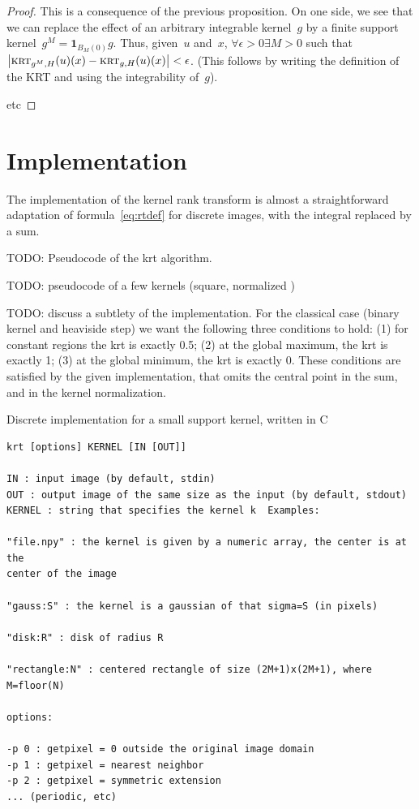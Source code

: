 \documentclass[12pt]{article}                  %
\begin{document}
\begin{proof}
	This is a consequence of the previous proposition.  On one side, we
	see that we can replace the effect of an arbitrary integrable
	kernel~$g$ by a finite support kernel~$g^M=\mathbf{1}_{B_M(0)}g$.
	Thus, given~$u$ and~$x$, $\forall\epsilon>0\exists M>0$ such
	that~$\left|\textsc{krt}_{g^M,H}(u)(x)-\textsc{krt}_{g,H}(u)(x)\right|<\epsilon$.  (This follows
	by writing the definition of the KRT and using the integrability
	of~$g$).

	etc
\end{proof}


\section{Implementation}

The implementation of the kernel rank transform is almost a straightforward
adaptation of formula~\ref{eq:rtdef} for discrete images, with the integral
replaced by a sum.

TODO: Pseudocode of the krt algorithm.

TODO: pseudocode of a few kernels (square, normalized )

TODO: discuss a subtlety of the implementation.  For the classical case
(binary kernel and heaviside step) we want the following three conditions to
hold: (1) for constant regions the krt is exactly 0.5;  (2) at the global
maximum, the krt is exactly 1; (3) at the global minimum, the krt is exactly
0.  These conditions are satisfied by the given implementation, that omits
the central point in the sum, and in the kernel normalization.

Discrete implementation for a small support kernel, written in C

{\small
\begin{verbatim}
krt [options] KERNEL [IN [OUT]]

IN : input image (by default, stdin)
OUT : output image of the same size as the input (by default, stdout)
KERNEL : string that specifies the kernel k  Examples:

"file.npy" : the kernel is given by a numeric array, the center is at the
center of the image

"gauss:S" : the kernel is a gaussian of that sigma=S (in pixels)

"disk:R" : disk of radius R

"rectangle:N" : centered rectangle of size (2M+1)x(2M+1), where M=floor(N)

options:

-p 0 : getpixel = 0 outside the original image domain
-p 1 : getpixel = nearest neighbor
-p 2 : getpixel = symmetric extension
... (periodic, etc)

\end{verbatim}
}
\end{document}
